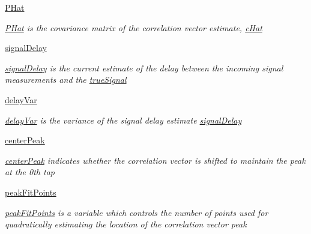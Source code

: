 \begin{DoxyCompactItemize}
\hyperlink{classSignalCorrelationSubstate_1_1CorrelationFilter_a9b079080abde4a661f95687e8ea89827}{P\+Hat}
\begin{DoxyCompactList}\small\item\em \hyperlink{classSignalCorrelationSubstate_1_1CorrelationFilter_a9b079080abde4a661f95687e8ea89827}{P\+Hat} is the covariance matrix of the correlation vector estimate, \hyperlink{classSignalCorrelationSubstate_1_1CorrelationFilter_ad07b1d484b9ab77a1a8fc215f10faf15}{c\+Hat} \end{DoxyCompactList}\item 
\hyperlink{classSignalCorrelationSubstate_1_1CorrelationFilter_a01e35890dee1d79bd0e4f9e82cb16e3f}{signal\+Delay}
\begin{DoxyCompactList}\small\item\em \hyperlink{classSignalCorrelationSubstate_1_1CorrelationFilter_a01e35890dee1d79bd0e4f9e82cb16e3f}{signal\+Delay} is the current estimate of the delay between the incoming signal measurements and the \hyperlink{classSignalCorrelationSubstate_1_1CorrelationFilter_a67ff75effd8a8a7e34f0f3e8c56ef491}{true\+Signal} \end{DoxyCompactList}\item 
\hyperlink{classSignalCorrelationSubstate_1_1CorrelationFilter_a34d52beb18c131f2305689d48f612a5a}{delay\+Var}
\begin{DoxyCompactList}\small\item\em \hyperlink{classSignalCorrelationSubstate_1_1CorrelationFilter_a34d52beb18c131f2305689d48f612a5a}{delay\+Var} is the variance of the signal delay estimate \hyperlink{classSignalCorrelationSubstate_1_1CorrelationFilter_a01e35890dee1d79bd0e4f9e82cb16e3f}{signal\+Delay} \end{DoxyCompactList}\item 
\hyperlink{classSignalCorrelationSubstate_1_1CorrelationFilter_a8e53182c2ff431a6a545a265cda6ba48}{center\+Peak}
\begin{DoxyCompactList}\small\item\em \hyperlink{classSignalCorrelationSubstate_1_1CorrelationFilter_a8e53182c2ff431a6a545a265cda6ba48}{center\+Peak} indicates whether the correlation vector is shifted to maintain the peak at the 0th tap \end{DoxyCompactList}\item 
\hyperlink{classSignalCorrelationSubstate_1_1CorrelationFilter_a85a73739e9bb0a7f20886a812a3afa83}{peak\+Fit\+Points}
\begin{DoxyCompactList}\small\item\em \hyperlink{classSignalCorrelationSubstate_1_1CorrelationFilter_a85a73739e9bb0a7f20886a812a3afa83}{peak\+Fit\+Points} is a variable which controls the number of points used for quadratically estimating the location of the correlation vector peak \end{DoxyCompactList}\item 

\end{DoxyCompactItemize}
